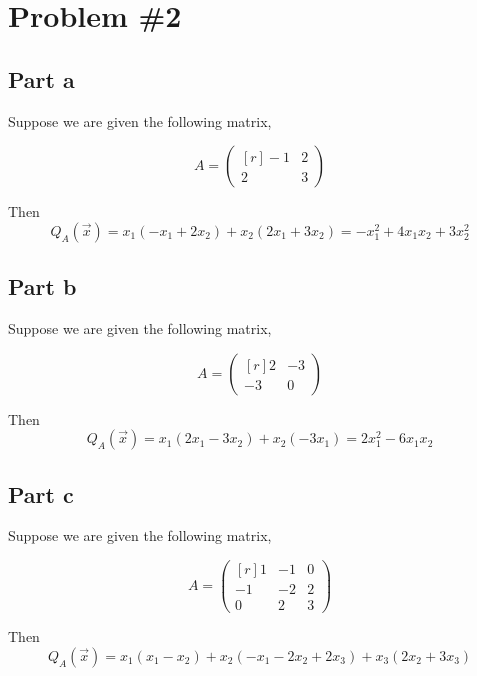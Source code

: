 \documentclass{article}
\begin{document}
\section*{Problem \#2}
\subsection*{Part a}
Suppose we are given the following matrix,

\begin{equation*}
   A = \begin{pmatrix*}[r]
    -1 & 2 \\
    2 & 3 
    \end{pmatrix*}
\end{equation*}

Then
\begin{equation*}
    Q_A(\vec{x}) = x_1(-x_1 + 2x_2) + x_2(2x_1 + 3x_2) = -x_1^2 + 4x_1x_2 + 3x_2^2 
\end{equation*}

\subsection*{Part b}
Suppose we are given the following matrix,

\begin{equation*}
   A = \begin{pmatrix*}[r]
    2 & -3 \\
    -3 & 0 
    \end{pmatrix*}
\end{equation*}

Then
\begin{equation*}
    Q_A(\vec{x}) = x_1(2x_1 - 3x_2) + x_2(-3x_1) = 2x_1^2 -6x_1x_2
\end{equation*}

\subsection*{Part c}
Suppose we are given the following matrix,

\begin{equation*}
   A = \begin{pmatrix*}[r]
    1 & -1 & 0\\
    -1 & -2 & 2 \\
    0 & 2 & 3
    \end{pmatrix*}
\end{equation*}

Then
\begin{equation*}
    Q_A(\vec{x}) = x_1(x_1 - x_2) + x_2(-x_1-2x_2 + 2x_3) + x_3(2x_2 + 3x_3) 
\end{equation*}
\end{document}

